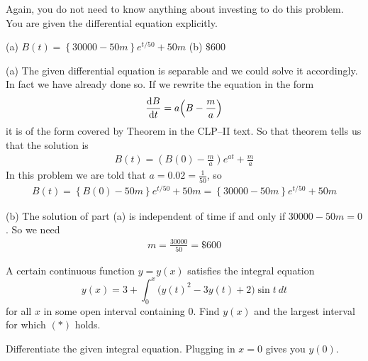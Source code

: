\begin{hint}
Again, you do not need to know anything about investing
 to do this problem. You are given the differential equation explicitly.
\end{hint}

\begin{answer}
(a) $B(t) = \left\{30000-50m\right\} e^{t/50} + 50m$
\qquad (b) $\$600$
\end{answer}

\begin{solution} (a)
The given differential equation is separable and we could solve it
accordingly. In fact we have already done so. If we rewrite the equation in the
form
\begin{align*}
\diff{B}{t} = a\Big(B-\frac{m}{a}\Big)
\end{align*}
it is of the form covered by Theorem 
in the CLP--II text. So that theorem tells us that the solution is
\begin{align*}
B(t) = \left(B(0)-\frac{m}{a}\right) e^{at} + \frac{m}{a}
\end{align*}
In this problem we are told that $a=0.02=\frac{1}{50}$, so
\begin{align*}
B(t) = \left\{B(0)-50m\right\} e^{t/50} + 50m
= \left\{30000-50m\right\} e^{t/50} + 50m
\end{align*}


\noindent (b)
The solution of part (a) is independent of time if and only if
$30000-50m=0$. So we need
\begin{align*}
m= \frac{30000}{50} = \$600
\end{align*}

\end{solution}

\begin{Mquestion}[M121 1999A]
A certain continuous function $y=y(x)$ satisfies the integral
equation
\begin{equation}
y(x)=3+\int_0^x\big(y(t)^2-3y(t)+2\big)\sin t\ dt
\tag{$*$}\end{equation}
for all $x$ in some open interval containing $0$. Find $y(x)$ and the largest
interval for which $(*)$ holds.
\end{Mquestion}

\begin{hint}
Differentiate the given integral equation. Plugging in $x=0$ gives you $y(0)$.
\end{hint}


